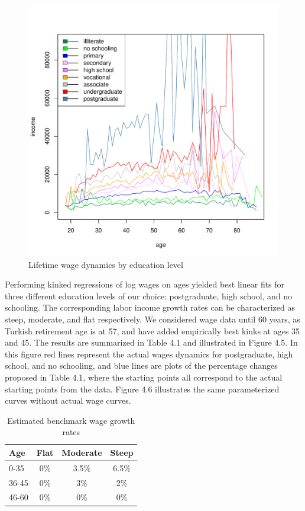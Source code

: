 \begin{figure}[h]
	\centering
	\includegraphics[scale=0.6]{figs/wage2educ.pdf}
	\caption{Lifetime wage dynamics by education level}
\end{figure}

Performing kinked regressions of log wages on ages yielded best linear fits for three different education levels of our choice: postgraduate, high school, and no schooling. The corresponding labor income growth rates can be characterized as steep, moderate, and flat respectively. We considered wage data until 60 years, as Turkish retirement age is at 57, and have added empirically best kinks at ages 35 and 45. The results are summarized in Table 4.1 and illustrated in Figure 4.5. In this figure red lines represent the actual wages dynamics for postgraduate, high school, and no schooling, and blue lines are plots of the percentage changes proposed in Table 4.1, where the starting points all correspond to the actual starting points from the data. Figure 4.6 illustrates the same parameterized curves without actual wage curves. 

\begin{table}
	\centering
	\begin{tabular}[c]{l|ccc}
		Age&Flat&Moderate&Steep\\
		\hline
		0-35&0\%&3.5\%&6.5\%\\
		36-45&0\%&3\%&2\%\\
		46-60&0\%&0\%&0\%\\
	\end{tabular}
	\caption{Estimated benchmark wage growth rates}
\end{table}


